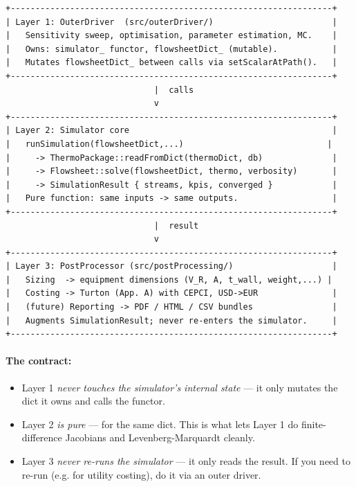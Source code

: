 \documentclass[11pt,a4paper]{article}
\begin{document}
\begin{lstlisting}
+-----------------------------------------------------------------+
| Layer 1: OuterDriver  (src/outerDriver/)                        |
|   Sensitivity sweep, optimisation, parameter estimation, MC.    |
|   Owns: simulator_ functor, flowsheetDict_ (mutable).           |
|   Mutates flowsheetDict_ between calls via setScalarAtPath().   |
+-----------------------------------------------------------------+
                              |  calls
                              v
+-----------------------------------------------------------------+
| Layer 2: Simulator core                                         |
|   runSimulation(flowsheetDict,...)                             |
|     -> ThermoPackage::readFromDict(thermoDict, db)              |
|     -> Flowsheet::solve(flowsheetDict, thermo, verbosity)       |
|     -> SimulationResult { streams, kpis, converged }            |
|   Pure function: same inputs -> same outputs.                   |
+-----------------------------------------------------------------+
                              |  result
                              v
+-----------------------------------------------------------------+
| Layer 3: PostProcessor (src/postProcessing/)                    |
|   Sizing  -> equipment dimensions (V_R, A, t_wall, weight,...) |
|   Costing -> Turton (App. A) with CEPCI, USD->EUR               |
|   (future) Reporting -> PDF / HTML / CSV bundles                |
|   Augments SimulationResult; never re-enters the simulator.     |
+-----------------------------------------------------------------+
\end{lstlisting}

\paragraph{The contract:}

\begin{itemize}[leftmargin=*]
  \item Layer 1 \emph{never touches the simulator's internal state} ---
        it only mutates the dict it owns and calls the functor.
  \item Layer 2 \emph{is pure} ---
         for the same dict.
        This is what lets Layer 1 do finite-difference Jacobians and
        Levenberg-Marquardt cleanly.
  \item Layer 3 \emph{never re-runs the simulator} --- it only reads
        the result. If you need to re-run (e.g. for utility costing), do
        it via an outer driver.
\end{itemize}
\end{document}
